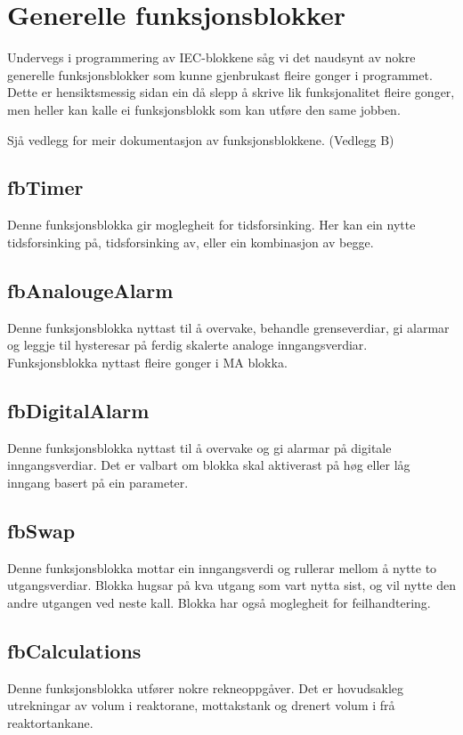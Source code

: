 \section{Generelle funksjonsblokker}
\thispagestyle{fancy}

Undervegs i programmering av \gls{IEC}-blokkene såg vi det naudsynt av nokre generelle funksjonsblokker
som kunne gjenbrukast fleire gonger i programmet. Dette er hensiktsmessig sidan ein då slepp å skrive lik 
funksjonalitet fleire gonger, men heller kan kalle ei funksjonsblokk som kan utføre den same jobben.

Sjå vedlegg for meir dokumentasjon av funksjonsblokkene. (Vedlegg B)

\subsection{fbTimer}
Denne funksjonsblokka gir moglegheit for tidsforsinking.
Her kan ein nytte tidsforsinking på, tidsforsinking av, eller ein kombinasjon av begge.

\subsection{fbAnalougeAlarm}
Denne funksjonsblokka nyttast til å overvake, behandle grenseverdiar, 
gi alarmar og leggje til hysteresar på ferdig skalerte analoge inngangsverdiar.
Funksjonsblokka nyttast fleire gonger i MA blokka.

\subsection{fbDigitalAlarm}
Denne funksjonsblokka nyttast til å overvake og gi alarmar på digitale inngangsverdiar. 
Det er valbart om blokka skal aktiverast på høg eller låg inngang basert på ein parameter.

\subsection{fbSwap}\label{sec:1}
Denne funksjonsblokka mottar ein inngangsverdi og rullerar mellom å nytte to utgangsverdiar. Blokka hugsar på kva utgang som vart nytta sist,
og vil nytte den andre utgangen ved neste kall. Blokka har også moglegheit for feilhandtering.

\subsection{fbCalculations}
Denne funksjonsblokka utfører nokre rekneoppgåver. 
Det er hovudsakleg utrekningar av volum i reaktorane, mottakstank og drenert volum i frå reaktortankane.

